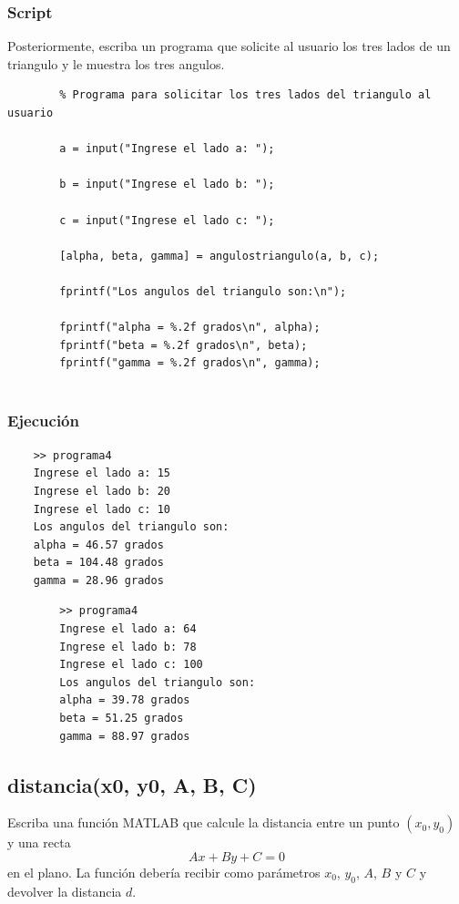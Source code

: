 \documentclass{article}
\begin{document}
	\subsubsection{Script}
	
	Posteriormente, escriba un programa que solicite al usuario los tres lados de un triangulo y le muestra los tres angulos.
	
	\begin{lstlisting}
		% Programa para solicitar los tres lados del triangulo al usuario
		
		a = input("Ingrese el lado a: ");
		
		b = input("Ingrese el lado b: ");
		
		c = input("Ingrese el lado c: ");
		
		[alpha, beta, gamma] = angulostriangulo(a, b, c);
		
		fprintf("Los angulos del triangulo son:\n");
		
		fprintf("alpha = %.2f grados\n", alpha);
		fprintf("beta = %.2f grados\n", beta);
		fprintf("gamma = %.2f grados\n", gamma);
		
	\end{lstlisting}
	
	\subsubsection{Ejecución}
	
	\begin{lstlisting}
	>> programa4
	Ingrese el lado a: 15
	Ingrese el lado b: 20
	Ingrese el lado c: 10
	Los angulos del triangulo son:
	alpha = 46.57 grados
	beta = 104.48 grados
	gamma = 28.96 grados
	\end{lstlisting}

	\begin{lstlisting}
		>> programa4
		Ingrese el lado a: 64
		Ingrese el lado b: 78
		Ingrese el lado c: 100
		Los angulos del triangulo son:
		alpha = 39.78 grados
		beta = 51.25 grados
		gamma = 88.97 grados
	\end{lstlisting}
	
	\newpage
	
	\subsection{distancia(x0, y0, A, B, C)} 
	Escriba una función MATLAB que calcule la distancia entre un punto $(x_0, y_0)$ y una recta $$Ax + By + C = 0$$ en el plano. La función debería recibir como parámetros $x_0$, $y_0$, $A$, $B$ y $C$ y devolver la distancia $d$.
	
\end{document}
